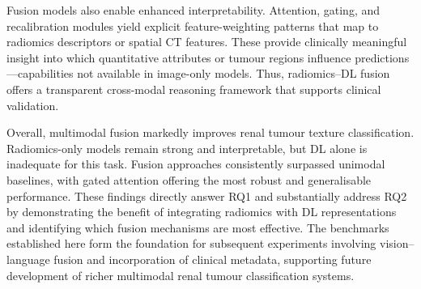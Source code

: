 Fusion models also enable enhanced interpretability. Attention, gating, and recalibration modules yield explicit feature-weighting patterns that map to radiomics descriptors or spatial CT features. These provide clinically meaningful insight into which quantitative attributes or tumour regions influence predictions—capabilities not available in image-only models. Thus, radiomics–DL fusion offers a transparent cross-modal reasoning framework that supports clinical validation.

Overall, multimodal fusion markedly improves renal tumour texture classification. Radiomics-only models remain strong and interpretable, but DL alone is inadequate for this task. Fusion approaches consistently surpassed unimodal baselines, with gated attention offering the most robust and generalisable performance. These findings directly answer RQ1 and substantially address RQ2 by demonstrating the benefit of integrating radiomics with DL representations and identifying which fusion mechanisms are most effective. The benchmarks established here form the foundation for subsequent experiments involving vision–language fusion and incorporation of clinical metadata, supporting future development of richer multimodal renal tumour classification systems.